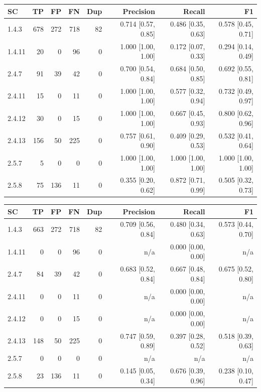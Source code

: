 \begin{tabular}{lrrrrrrr}
\hline
SC & TP & FP & FN & Dup & Precision & Recall & F1 \\
\hline
1.4.3 & 678 & 272 & 718 & 82 & 0.714 [0.57, 0.85] & 0.486 [0.35, 0.63] & 0.578 [0.45, 0.71] \\
1.4.11 & 20 & 0 & 96 & 0 & 1.000 [1.00, 1.00] & 0.172 [0.07, 0.33] & 0.294 [0.14, 0.49] \\
2.4.7 & 91 & 39 & 42 & 0 & 0.700 [0.54, 0.84] & 0.684 [0.50, 0.85] & 0.692 [0.55, 0.81] \\
2.4.11 & 15 & 0 & 11 & 0 & 1.000 [1.00, 1.00] & 0.577 [0.32, 0.94] & 0.732 [0.49, 0.97] \\
2.4.12 & 30 & 0 & 15 & 0 & 1.000 [1.00, 1.00] & 0.667 [0.45, 0.93] & 0.800 [0.62, 0.96] \\
2.4.13 & 156 & 50 & 225 & 0 & 0.757 [0.61, 0.90] & 0.409 [0.29, 0.53] & 0.532 [0.41, 0.64] \\
2.5.7 & 5 & 0 & 0 & 0 & 1.000 [1.00, 1.00] & 1.000 [1.00, 1.00] & 1.000 [1.00, 1.00] \\
2.5.8 & 75 & 136 & 11 & 0 & 0.355 [0.20, 0.62] & 0.872 [0.71, 0.99] & 0.505 [0.32, 0.73] \\
\hline
\end{tabular}

\begin{tabular}{lrrrrrrr}
\hline
SC & TP & FP & FN & Dup & Precision & Recall & F1 \\
\hline
1.4.3 & 663 & 272 & 718 & 82 & 0.709 [0.56, 0.84] & 0.480 [0.34, 0.63] & 0.573 [0.44, 0.70] \\
1.4.11 & 0 & 0 & 96 & 0 & n/a & 0.000 [0.00, 0.00] & n/a \\
2.4.7 & 84 & 39 & 42 & 0 & 0.683 [0.52, 0.84] & 0.667 [0.48, 0.84] & 0.675 [0.52, 0.80] \\
2.4.11 & 0 & 0 & 11 & 0 & n/a & 0.000 [0.00, 0.00] & n/a \\
2.4.12 & 0 & 0 & 15 & 0 & n/a & 0.000 [0.00, 0.00] & n/a \\
2.4.13 & 148 & 50 & 225 & 0 & 0.747 [0.59, 0.89] & 0.397 [0.28, 0.52] & 0.518 [0.39, 0.63] \\
2.5.7 & 0 & 0 & 0 & 0 & n/a & n/a & n/a \\
2.5.8 & 23 & 136 & 11 & 0 & 0.145 [0.05, 0.34] & 0.676 [0.39, 0.96] & 0.238 [0.10, 0.47] \\
\hline
\end{tabular}

